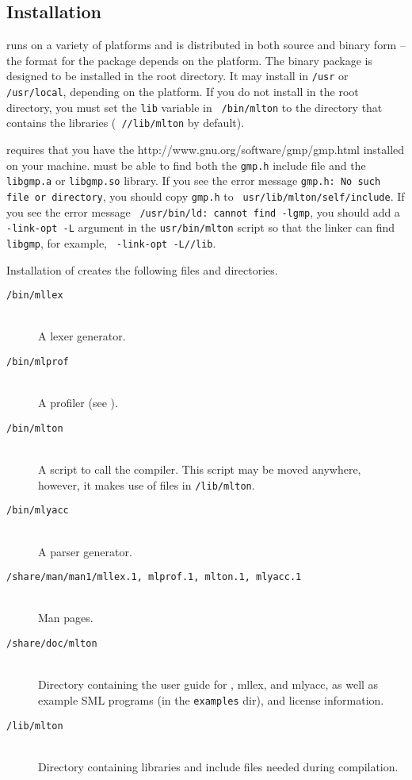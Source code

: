 %
\subsection{Installation}
%
{\mlton} runs on a variety of platforms and is distributed in both
source and binary form -- the format for the package depends on the
platform.  The binary package is designed to be installed in the root
directory.  It may install in {\tt /usr} or {\tt /usr/local},
depending on the platform.  If you do not install {\mlton} in the root
directory, you must set the {\tt lib} variable in {\tt
\prefix/bin/mlton} to the directory that contains the libraries ({\tt
/\prefix/lib/mlton} by default).

{\mlton} requires that you have the
		  {http://www.gnu.org/software/gmp/gmp.html}
installed on your machine.  {\mlton} must be able to find both the
{\tt gmp.h} include file and the {\tt libgmp.a} or {\tt libgmp.so}
library. If you see the error message {\tt gmp.h: No such file or
directory}, you should copy {\tt gmp.h} to {\tt
usr/lib/mlton/self/include}.  If you see the error message {\tt
/usr/bin/ld: cannot find -lgmp}, you 
should add a {\tt -link-opt -L} argument in the {\tt usr/bin/mlton}
script so that the linker can find {\tt libgmp}, for example, {\tt
-link-opt -L/\prefix/lib}.

Installation of {\mlton} creates the following files and directories.

\newcommand{\place}[1]{\item[\tt #1]\hspace{1in}\\}

\begin{description}

\place{\prefix/bin/mllex}
A lexer generator.

\place{\prefix/bin/mlprof}
A profiler (see ).

\place{\prefix/bin/mlton}
A script to call the compiler.
This script may be moved anywhere, however,
it makes use of files in {\tt \prefix/lib/mlton}.

\place{\prefix/bin/mlyacc}
A parser generator.

\place{\prefix/share/man/man1/mllex.1, mlprof.1, mlton.1, mlyacc.1}
Man pages.

\place{\prefix/share/doc/mlton}
Directory containing the user guide for {\mlton}, mllex, and mlyacc,
as well as example SML programs (in the {\tt examples} dir), and
license information.

\place{\prefix/lib/mlton}
Directory containing libraries and include files needed during
compilation.

\end{description}

